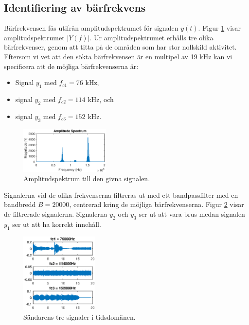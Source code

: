 \documentclass[10pt,twocolumn]{article}
\begin{document}
\subsection{Identifiering av bärfrekvens}

Bärfrekvensen fås utifrån amplitudspektrumet för signalen $y(t)$. Figur \ref{ampl} visar amplitudspektrumet $|Y(f)|$. Ur amplitudspektrumet erhålls tre olika bärfrekvenser, genom att titta på de områden som har stor nollskild aktivitet. Eftersom vi vet att den sökta bärfrekvensen är en multipel av 19 kHz kan vi specificera att de möjliga bärfrekvenserna är:

\begin{itemize}

	\item Signal $y_1$ med $f_{c1} = 76$ kHz,
	\item signal $y_2$ med $f_{c2} = 114$ kHz, och
	\item signal $y_3$ med $f_{c3} = 152$ kHz.

\end{itemize}

\begin{figure}[H]
	\centering
	\includegraphics[width=0.4\textwidth]{figures/figure1.eps}
	\caption{Amplitudspektrum till den givna signalen.}
	\label{ampl}
\end{figure}

Signalerna vid de olika frekvenserna filtreras ut med ett bandpassfilter med en bandbredd $B = 20000$, centrerad kring de möjliga bärfrekvenserna.
Figur \ref{filtered} visar de filtrerade signalerna. Signalerna $y_2$ och $y_3$ ser ut att vara brus medan signalen $y_1$ ser ut att ha korrekt innehåll.

\begin{figure}[H]
	\centering
	\includegraphics[width=0.35\textwidth]{figures/figure2.eps}
	\caption{Sändarens tre signaler i tidsdomänen. }
	\label{filtered}
\end{figure}
\end{document}
